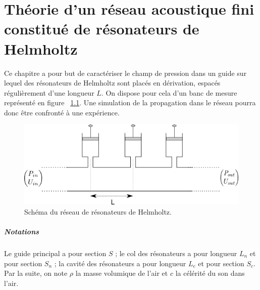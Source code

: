 \chapter{Théorie d'un réseau acoustique fini constitué de résonateurs de Helmholtz}
Ce chapitre a pour but de caractériser le champ de pression dans un guide sur lequel des résonateurs de Helmholtz sont placés en dérivation, espacés régulièrement d'une longueur $L$. On dispose pour cela d'un banc de mesure représenté en figure ~\ref{schema_infini}. Une simulation de la propagation dans le réseau pourra donc être confronté à une expérience.

\begin{figure}[!ht] \centering
\includegraphics[scale=0.5]{./images_chp1/schema_reseau_infini.png}
\caption{\label{schema_infini} Schéma du réseau de résonateurs de Helmholtz.}
\end{figure}

\paragraph{Notations}
Le guide principal a pour section $S$ ; le col des résonateurs a pour longueur $L_{n}$ et pour section $S_{n}$ ; la cavité des résonateurs a pour longueur $L_{c}$ et pour section $S_{c}$. Par la suite, on note $\rho$ la masse volumique de l'air et $c$ la célérité du son dans l'air.

